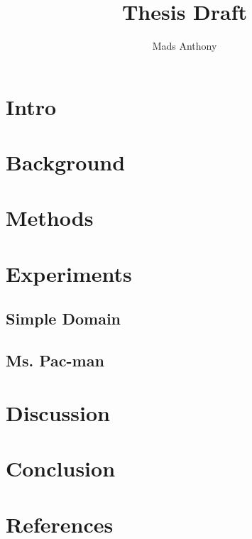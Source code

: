 \documentclass[11pt, a4paper]{article}
\begin{document}
\author{Mads Anthony}
\title{Thesis Draft}
\maketitle
\newpage
\tableofcontents
\newpage
\section{Intro}
\section{Background}
\section{Methods}
\section{Experiments}
\subsection{Simple Domain}
\subsection{Ms. Pac-man}
\section{Discussion}
\section{Conclusion}
\section{References}
\end{document}
